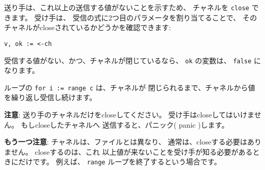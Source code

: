 送り手は、これ以上の送信する値がないことを示すため、
チャネルを \texttt{close} できます。 受け手は、
受信の式に2つ目のパラメータを割り当てることで、
そのチャネルがcloseされているかどうかを確認できます:

\begin{lstlisting}[numbers=none]
v, ok := <-ch
\end{lstlisting}
受信する値がない、かつ、チャネルが閉じているなら、
\texttt{ok} の変数は、 \texttt{false} になります。

ループの \texttt{for i := range c} は、チャネルが
閉じられるまで、チャネルから値を繰り返し受信し続けます。

\textbf{注意}: 送り手のチャネルだけをcloseしてください。
受け手はcloseしてはいけません。 もしcloseしたチャネルへ
送信すると、パニック( panic )します。

\textbf{もう一つ注意}: チャネルは、ファイルとは異なり、
通常は、closeする必要はありません。 closeするのは、これ
以上値が来ないことを受け手が知る必要があるときにだけです。
例えば、 \texttt{range} ループを終了するという場合です。